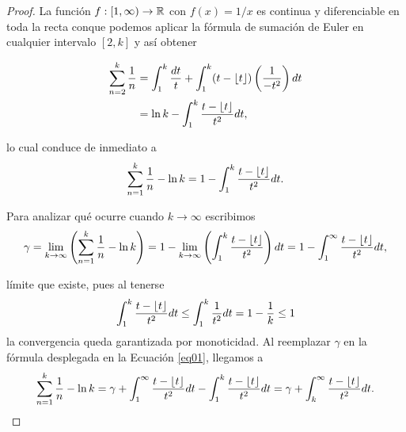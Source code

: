 \begin{proof}
La funci\'on $f : [1, \infty) \to \mathbb{R}$ con $f(x)=1/x$ es continua y diferenciable en toda la recta  
conque podemos aplicar la f\'ormula de sumaci\'on de Euler en cualquier intervalo $[2, k]$ 
y as\'i obtener 

\begin{align}
\sum_{n = 2}^k \frac{1}{n} &= \int_1^k \frac{dt}{t} + \int_{1}^k (t - \left\lfloor t \right\rfloor)\left(\frac{1}{-t^2}\right) dt \\
&= \ln k - \int_1^k \frac{t - \left\lfloor t \right\rfloor}{t^2} dt,
\end{align} 

lo cual conduce de inmediato a 
\begin{align}
\sum_{n = 1}^k \frac{1}{n} - \ln k = 1 - \int_1^k \frac{t - \left\lfloor t \right\rfloor}{t^2} dt.\label{eq01}
\end{align}

Para analizar qu\'e ocurre cuando $k \to \infty$ escribimos
\begin{align}
\gamma = \lim_{k \to \infty} \left(\sum_{n = 1}^k \frac{1}{n} - \ln k\right) 
= 1- \lim_{k \to \infty}  \left(\int_1^k \frac{t - \left\lfloor t \right\rfloor}{t^2}\right) dt 
=  1- \int_1^\infty \frac{t - \left\lfloor t \right\rfloor}{t^2} dt,
\end{align}

l\'imite que existe, pues al tenerse 
\begin{align}
\int_1^k \frac{t - \left\lfloor t \right\rfloor}{t^2} dt  \le \int_1^k \frac{1}{t^2} dt 
= 1 -\frac{1}{k}   \le 1
\end{align}
la convergencia queda garantizada por monoticidad. 
Al reemplazar $\gamma$ en la f\'ormula desplegada en la Ecuaci\'on \ref{eq01}, llegamos a 
\begin{align}
\sum_{n = 1}^k \frac{1}{n} - \ln k = \gamma + \int_1^\infty \frac{t - \left\lfloor t \right\rfloor}{t^2} dt - \int_1^k \frac{t - \left\lfloor t \right\rfloor}{t^2} dt = 
 \gamma  +  \int_k^\infty \frac{t - \left\lfloor t \right\rfloor}{t^2} dt.
\end{align}


\end{proof}

